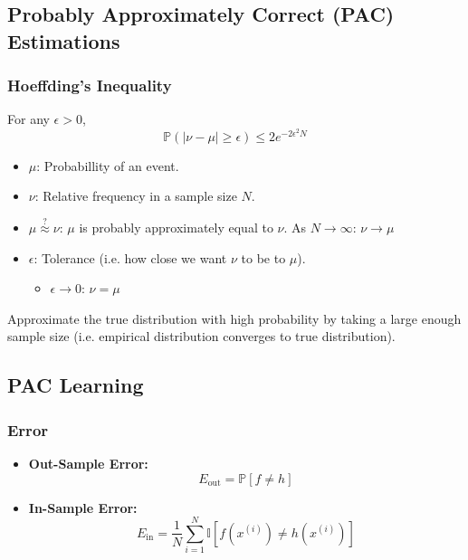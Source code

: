 \subsection{Probably Approximately Correct (PAC) Estimations}

\subsubsection{Hoeffding's Inequality}
\begin{definition}
    For any $\epsilon > 0$,
    \begin{equation}
        \mathbb{P}(|\nu - \mu| \geq \epsilon) \leq 2e^{-2\epsilon^2N}
    \end{equation}
    \begin{itemize}
        \item $\mu$: Probabillity of an event.
        \item $\nu$: Relative frequency in a sample size $N$.
        \item $\mu \overset{?}{\approx} \nu $: $\mu$ is probably approximately equal to $\nu$. As $N \rightarrow \infty$: $\nu \rightarrow \mu$
        \item $\epsilon$: Tolerance (i.e. how close we want $\nu$ to be to $\mu$).
        \begin{itemize}
            \item $\epsilon \rightarrow 0$: $\nu = \mu$
        \end{itemize}
    \end{itemize}
\end{definition}

\begin{warning}
    Approximate the true distribution with high probability by taking a large enough sample size (i.e. empirical distribution converges to true distribution).
\end{warning}

\subsection{PAC Learning}
\subsubsection{Error}
\begin{definition}
    \begin{itemize}
        \item \textbf{Out-Sample Error:}
        \begin{equation*}
            E_{\text{out}} = \mathbb{P}[f \neq h]
        \end{equation*}
        \item \textbf{In-Sample Error:}
        \begin{equation*}
            E_{\text{in}} = \frac{1}{N} \sum_{i=1}^{N} \mathbb{I}[f(x^{(i)}) \neq h(x^{(i)})]
        \end{equation*}
    \end{itemize}
\end{definition}

